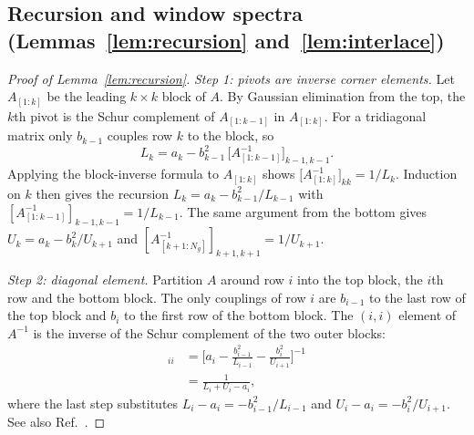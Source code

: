 \documentclass[aps,prb,twocolumn,superscriptaddress,floatfix,longbibliography]{revtex4-2}
\theoremstyle{remark}
\begin{document}
\subsection{Recursion and window spectra (Lemmas~\ref{lem:recursion} and~\ref{lem:interlace})}

\begin{proof}[Proof of Lemma~\ref{lem:recursion}]
\emph{Step 1: pivots are inverse corner elements.} Let $A_{[1:k]}$ be the leading $k\times k$ block of $A$. By Gaussian
elimination from the top, the $k$th pivot is the Schur complement of $A_{[1:k-1]}$ in $A_{[1:k]}$. For a tridiagonal matrix
only $b_{k-1}$ couples row $k$ to the block, so
\begin{equation}
L_k=a_k-b_{k-1}^2\,\big[A_{[1:k-1]}^{-1}\big]_{k-1,k-1}.
\end{equation}
Applying the block-inverse formula to $A_{[1:k]}$ shows $\big[A_{[1:k]}^{-1}\big]_{kk}=1/L_k$. Induction on $k$ then gives
the recursion $L_k=a_k-b_{k-1}^2/L_{k-1}$ with $[A_{[1:k-1]}^{-1}]_{k-1,k-1}=1/L_{k-1}$. The same argument from the bottom
gives $U_k=a_k-b_k^2/U_{k+1}$ and $[A_{[k+1:N_g]}^{-1}]_{k+1,k+1}=1/U_{k+1}$.

\emph{Step 2: diagonal element.} Partition $A$ around row $i$ into the top block, the $i$th row and the bottom block. The
only couplings of row $i$ are $b_{i-1}$ to the last row of the top block and $b_i$ to the first row of the bottom block. The
$(i,i)$ element of $A^{-1}$ is the inverse of the Schur complement of the two outer blocks:
\begin{align}
[A^{-1}]_{ii}
&=\Big[a_i-\frac{b_{i-1}^2}{L_{i-1}}-\frac{b_i^2}{U_{i+1}}\Big]^{-1}\nonumber\\
&=\frac{1}{L_i+U_i-a_i},
\end{align}
where the last step substitutes $L_i-a_i=-b_{i-1}^2/L_{i-1}$ and $U_i-a_i=-b_i^2/U_{i+1}$. See also
Ref.~\cite{Meurant1992}.
\end{proof}
\end{document}
